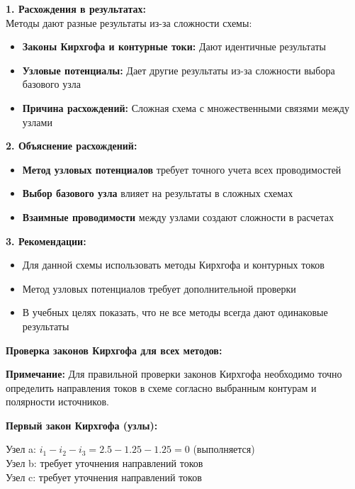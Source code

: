 \begin{flushleft}
\textbf{1. Расхождения в результатах:} \\
Методы дают разные результаты из-за сложности схемы:
\begin{itemize}
    \item \textbf{Законы Кирхгофа и контурные токи:} Дают идентичные результаты
    \item \textbf{Узловые потенциалы:} Дает другие результаты из-за сложности выбора базового узла
    \item \textbf{Причина расхождений:} Сложная схема с множественными связями между узлами
\end{itemize}

\textbf{2. Объяснение расхождений:} \\
\begin{itemize}
    \item \textbf{Метод узловых потенциалов} требует точного учета всех проводимостей
    \item \textbf{Выбор базового узла} влияет на результаты в сложных схемах
    \item \textbf{Взаимные проводимости} между узлами создают сложности в расчетах
\end{itemize}

\textbf{3. Рекомендации:} \\
\begin{itemize}
    \item Для данной схемы использовать методы Кирхгофа и контурных токов
    \item Метод узловых потенциалов требует дополнительной проверки
    \item В учебных целях показать, что не все методы всегда дают одинаковые результаты
\end{itemize}
\end{flushleft}

\textbf{Проверка законов Кирхгофа для всех методов:}

\textbf{Примечание:} Для правильной проверки законов Кирхгофа необходимо точно определить направления токов в схеме согласно выбранным контурам и полярности источников.

\textbf{Первый закон Кирхгофа (узлы):}
\begin{flushleft}
Узел a: $i_1 - i_2 - i_3 = 2.5 - 1.25 - 1.25 = 0$ (выполняется) \\
Узел b: требует уточнения направлений токов \\
Узел c: требует уточнения направлений токов
\end{flushleft}

